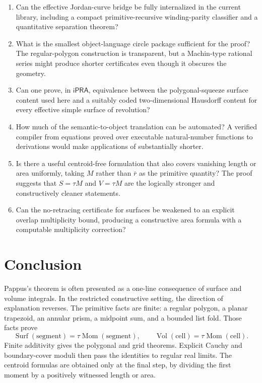 \documentclass[11pt]{article}
\theoremstyle{definition}
\newcommand{\ipra}{\mathsf{iPRA}}
\newcommand{\Vol}{\operatorname{Vol}}
\newcommand{\Mom}{\operatorname{Mom}}
\newcommand{\Surf}{\operatorname{Surf}}
\newcommand{\code}[1]{\texttt{\detokenize{#1}}}
\begin{document}
\begin{enumerate}[leftmargin=2.2em]
\item Can the effective Jordan-curve bridge be fully internalized in the
current \code{ConciseIPRA} library, including a compact primitive-recursive
winding-parity classifier and a quantitative separation theorem?

\item What is the smallest object-language circle package sufficient for the
proof?  The regular-polygon construction is transparent, but a Machin-type
rational series might produce shorter certificates even though it obscures
the geometry.

\item Can one prove, in $\ipra$, equivalence between the polygonal-squeeze
surface content used here and a suitably coded two-dimensional Hausdorff
content for every effective simple surface of revolution?

\item How much of the semantic-to-object translation can be automated?  A
verified compiler from equations proved over executable natural-number
functions to \code{PRAAx} derivations would make applications of
\code{PRA.qfInd} substantially shorter.

\item Is there a useful centroid-free formulation that also covers vanishing
length or area uniformly, taking $M$ rather than $\bar r$ as the primitive
quantity?  The proof suggests that $S=\tau M$ and $V=\tau M$ are the logically
stronger and constructively cleaner statements.

\item Can the no-retracing certificate for surfaces be weakened to an
explicit overlap multiplicity bound, producing a constructive area formula
with a computable multiplicity correction?
\end{enumerate}

\section{Conclusion}

Pappus's theorem is often presented as a one-line consequence of surface and
volume integrals.  In the restricted constructive setting, the direction of
explanation reverses.  The primitive facts are finite: a regular polygon, a
planar trapezoid, an annular prism, a midpoint sum, and a bounded list fold.
Those facts prove
\[
 \Surf(\text{segment})=\tau\Mom(\text{segment}),
 \qquad
 \Vol(\text{cell})=\tau\Mom(\text{cell}).
\]
Finite additivity gives the polygonal and grid theorems.  Explicit Cauchy and
boundary-cover moduli then pass the identities to regular real limits.  The
centroid formulas are obtained only at the final step, by dividing the first
moment by a positively witnessed length or area.
\end{document}
